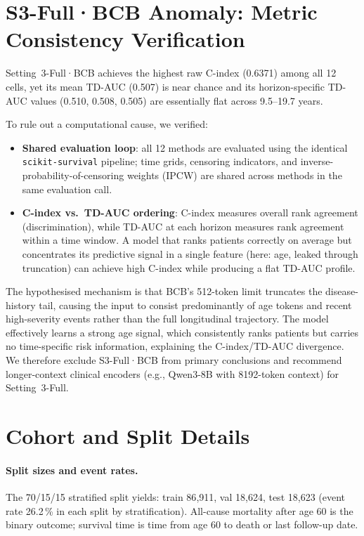 \documentclass[runningheads]{llncs}
\begin{document}
\section{S3-Full·BCB Anomaly: Metric Consistency Verification}
\label{supp:bcb_anomaly}

Setting~3-Full·BCB achieves the highest raw C-index (0.6371) among all 12
cells, yet its mean TD-AUC (0.507) is near chance and its horizon-specific
TD-AUC values (0.510, 0.508, 0.505) are essentially flat across 9.5--19.7
years.

To rule out a computational cause, we verified:
\begin{itemize}
  \item \textbf{Shared evaluation loop}: all 12 methods are evaluated using
        the identical \texttt{scikit-survival} pipeline; time grids, censoring
        indicators, and inverse-probability-of-censoring weights (IPCW) are
        shared across methods in the same evaluation call.
  \item \textbf{C-index vs.\ TD-AUC ordering}: C-index measures overall rank
        agreement (discrimination), while TD-AUC at each horizon measures
        rank agreement within a time window.
        A model that ranks patients correctly on average but concentrates its
        predictive signal in a single feature (here: age, leaked through
        truncation) can achieve high C-index while producing a flat TD-AUC
        profile.
\end{itemize}

The hypothesised mechanism is that BCB's 512-token limit truncates the
disease-history tail, causing the input to consist predominantly of age tokens
and recent high-severity events rather than the full longitudinal trajectory.
The model effectively learns a strong age signal, which consistently ranks
patients but carries no time-specific risk information, explaining the
C-index/TD-AUC divergence.
We therefore exclude S3-Full·BCB from primary conclusions and recommend
longer-context clinical encoders (e.g., Qwen3-8B with 8192-token context)
for Setting~3-Full.

\section{Cohort and Split Details}
\label{supp:cohort}

\paragraph{Split sizes and event rates.}
The 70/15/15 stratified split yields: train 86{,}911, val 18{,}624,
test 18{,}623 (event rate 26.2\,\% in each split by stratification).
All-cause mortality after age 60 is the binary outcome; survival time is
time from age 60 to death or last follow-up date.
\end{document}
